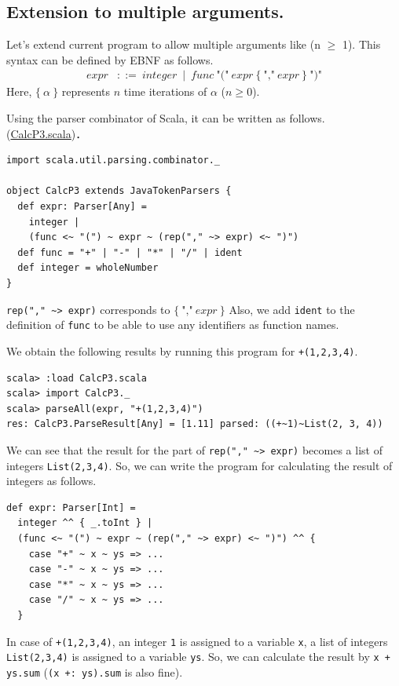 \documentclass[11pt]{article}
\begin{document}
\subsection{Extension to multiple arguments.}
\label{sec:orgheadline9}
Let's extend current program to allow multiple arguments like 
 (n \(\ge\) 1). 
This syntax can be defined by EBNF as follows. 
\begin{align*}
  \textit{expr} & ::=\ 
  \textit{integer}\ \mid\ 
  \textit{func}\ \mbox{"("}\ \textit{expr}\ \{\ \mbox{","}\ \textit{expr}\ \}\ \mbox{")"}
\end{align*}
Here, \(\{\ \alpha\ \}\) represents \(n\) time iterations of \(\alpha\) (\(n \ge 0\)).

Using the parser combinator of Scala, it can be written as follows. 
(\href{prog/parser/CalcP3.scala}{CalcP3.scala})．

\begin{verbatim}
import scala.util.parsing.combinator._

object CalcP3 extends JavaTokenParsers {
  def expr: Parser[Any] =
    integer |
    (func <~ "(") ~ expr ~ (rep("," ~> expr) <~ ")")
  def func = "+" | "-" | "*" | "/" | ident
  def integer = wholeNumber
}
\end{verbatim}

\texttt{rep("," \textasciitilde{}> expr)} corresponds to \(\{\ \mbox{","}\ \textit{expr}\ \}\)
Also, we add \texttt{ident} to the definition of \texttt{func} to be able to use any
identifiers as function names. 

We obtain the following results by running this program for \texttt{+(1,2,3,4)}.
\begin{verbatim}
scala> :load CalcP3.scala
scala> import CalcP3._
scala> parseAll(expr, "+(1,2,3,4)")
res: CalcP3.ParseResult[Any] = [1.11] parsed: ((+~1)~List(2, 3, 4))
\end{verbatim}

We can see that the result for the part of \texttt{rep("," \textasciitilde{}> expr)} becomes
a list of integers  \texttt{List(2,3,4)}. 
So, we can write the program for calculating the result of integers as follows.
\begin{verbatim}
def expr: Parser[Int] =
  integer ^^ { _.toInt } |
  (func <~ "(") ~ expr ~ (rep("," ~> expr) <~ ")") ^^ {
    case "+" ~ x ~ ys => ...
    case "-" ~ x ~ ys => ...
    case "*" ~ x ~ ys => ...
    case "/" ~ x ~ ys => ...
  }
\end{verbatim}

In case of \texttt{+(1,2,3,4)}, 
an integer \texttt{1} is assigned to a variable \texttt{x},
a list of integers \texttt{List(2,3,4)} is assigned to a variable \texttt{ys}.
So, we can calculate the result by \texttt{x + ys.sum} (\texttt{(x +: ys).sum} is
also fine). 
\end{document}

